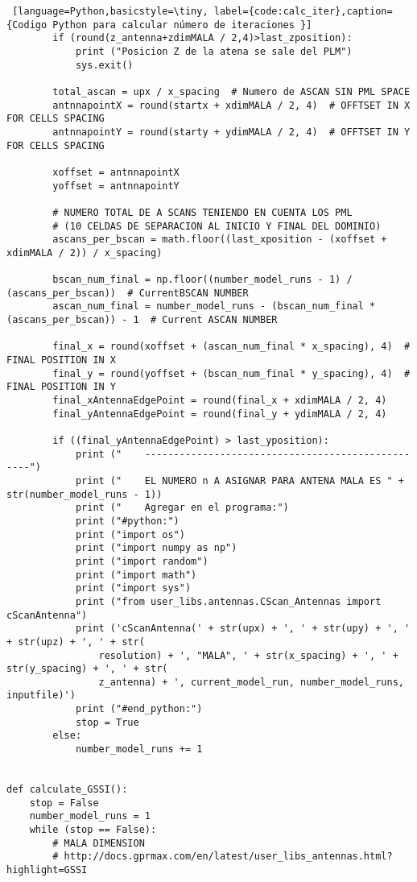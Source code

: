 \begin{lstlisting} [language=Python,basicstyle=\tiny, label={code:calc_iter},caption= {Codigo Python para calcular número de iteraciones }]
        if (round(z_antenna+zdimMALA / 2,4)>last_zposition):
            print ("Posicion Z de la atena se sale del PLM")
            sys.exit()

        total_ascan = upx / x_spacing  # Numero de ASCAN SIN PML SPACE
        antnnapointX = round(startx + xdimMALA / 2, 4)  # OFFTSET IN X FOR CELLS SPACING
        antnnapointY = round(starty + ydimMALA / 2, 4)  # OFFTSET IN Y FOR CELLS SPACING

        xoffset = antnnapointX
        yoffset = antnnapointY

        # NUMERO TOTAL DE A SCANS TENIENDO EN CUENTA LOS PML
        # (10 CELDAS DE SEPARACION AL INICIO Y FINAL DEL DOMINIO)
        ascans_per_bscan = math.floor((last_xposition - (xoffset + xdimMALA / 2)) / x_spacing)

        bscan_num_final = np.floor((number_model_runs - 1) / (ascans_per_bscan))  # CurrentBSCAN NUMBER
        ascan_num_final = number_model_runs - (bscan_num_final * (ascans_per_bscan)) - 1  # Current ASCAN NUMBER

        final_x = round(xoffset + (ascan_num_final * x_spacing), 4)  # FINAL POSITION IN X
        final_y = round(yoffset + (bscan_num_final * y_spacing), 4)  # FINAL POSITION IN Y
        final_xAntennaEdgePoint = round(final_x + xdimMALA / 2, 4)
        final_yAntennaEdgePoint = round(final_y + ydimMALA / 2, 4)

        if ((final_yAntennaEdgePoint) > last_yposition):
            print ("    --------------------------------------------------")
            print ("    EL NUMERO n A ASIGNAR PARA ANTENA MALA ES " + str(number_model_runs - 1))
            print ("    Agregar en el programa:")
            print ("#python:")
            print ("import os")
            print ("import numpy as np")
            print ("import random")
            print ("import math")
            print ("import sys")
            print ("from user_libs.antennas.CScan_Antennas import cScanAntenna")
            print ('cScanAntenna(' + str(upx) + ', ' + str(upy) + ', ' + str(upz) + ', ' + str(
                resolution) + ', "MALA", ' + str(x_spacing) + ', ' + str(y_spacing) + ', ' + str(
                z_antenna) + ', current_model_run, number_model_runs, inputfile)')
            print ("#end_python:")
            stop = True
        else:
            number_model_runs += 1


def calculate_GSSI():
    stop = False
    number_model_runs = 1
    while (stop == False):
        # MALA DIMENSION
        # http://docs.gprmax.com/en/latest/user_libs_antennas.html?highlight=GSSI
        

\end{lstlisting}
